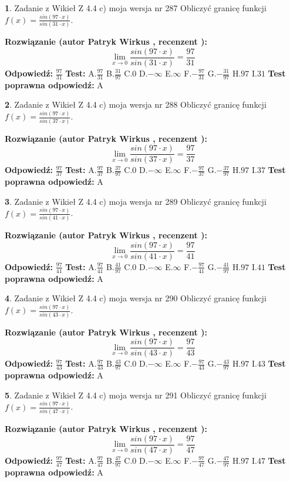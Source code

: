 \documentclass[12pt, a4paper]{article}
\theoremstyle{definition} %
\newtheorem{zad}{}
\newcommand{\zadStart}[1]{\begin{zad}#1\newline}
\newcommand{\zadStop}{\end{zad}}
\newcommand{\rozwStart}[2]{\noindent \textbf{Rozwiązanie (autor #1 , recenzent #2): }\newline}
\newcommand{\rozwStop}{\newline}
\newcommand{\odpStart}{\noindent \textbf{Odpowiedź:}\newline}
\newcommand{\odpStop}{\newline}
\newcommand{\testStart}{\noindent \textbf{Test:}\newline}
\newcommand{\testStop}{\newline}
\newcommand{\kluczStart}{\noindent \textbf{Test poprawna odpowiedź:}\newline}
\newcommand{\kluczStop}{\newline}
\begin{document}
\zadStart{Zadanie z Wikieł Z 4.4 c) moja wersja nr 287}
Obliczyć granicę funkcji $f(x)=\frac{sin(97\cdot x)}{sin(31\cdot x)}$.
\zadStop
\rozwStart{Patryk Wirkus}{}
$$\lim\limits_{x\to 0}\frac{sin(97\cdot x)}{sin(31\cdot x)}=
\frac{97}{31}$$
\rozwStop
\odpStart
$\frac{97}{31}$
\odpStop
\testStart
A.$\frac{97}{31}$
B.$\frac{31}{97}$
C.$0$
D.$-\infty$
E.$\infty$
F.$-\frac{97}{31}$
G.$-\frac{31}{97}$
H.$97$
I.$31$
\testStop
\kluczStart
A
\kluczStop



\zadStart{Zadanie z Wikieł Z 4.4 c) moja wersja nr 288}
Obliczyć granicę funkcji $f(x)=\frac{sin(97\cdot x)}{sin(37\cdot x)}$.
\zadStop
\rozwStart{Patryk Wirkus}{}
$$\lim\limits_{x\to 0}\frac{sin(97\cdot x)}{sin(37\cdot x)}=
\frac{97}{37}$$
\rozwStop
\odpStart
$\frac{97}{37}$
\odpStop
\testStart
A.$\frac{97}{37}$
B.$\frac{37}{97}$
C.$0$
D.$-\infty$
E.$\infty$
F.$-\frac{97}{37}$
G.$-\frac{37}{97}$
H.$97$
I.$37$
\testStop
\kluczStart
A
\kluczStop



\zadStart{Zadanie z Wikieł Z 4.4 c) moja wersja nr 289}
Obliczyć granicę funkcji $f(x)=\frac{sin(97\cdot x)}{sin(41\cdot x)}$.
\zadStop
\rozwStart{Patryk Wirkus}{}
$$\lim\limits_{x\to 0}\frac{sin(97\cdot x)}{sin(41\cdot x)}=
\frac{97}{41}$$
\rozwStop
\odpStart
$\frac{97}{41}$
\odpStop
\testStart
A.$\frac{97}{41}$
B.$\frac{41}{97}$
C.$0$
D.$-\infty$
E.$\infty$
F.$-\frac{97}{41}$
G.$-\frac{41}{97}$
H.$97$
I.$41$
\testStop
\kluczStart
A
\kluczStop



\zadStart{Zadanie z Wikieł Z 4.4 c) moja wersja nr 290}
Obliczyć granicę funkcji $f(x)=\frac{sin(97\cdot x)}{sin(43\cdot x)}$.
\zadStop
\rozwStart{Patryk Wirkus}{}
$$\lim\limits_{x\to 0}\frac{sin(97\cdot x)}{sin(43\cdot x)}=
\frac{97}{43}$$
\rozwStop
\odpStart
$\frac{97}{43}$
\odpStop
\testStart
A.$\frac{97}{43}$
B.$\frac{43}{97}$
C.$0$
D.$-\infty$
E.$\infty$
F.$-\frac{97}{43}$
G.$-\frac{43}{97}$
H.$97$
I.$43$
\testStop
\kluczStart
A
\kluczStop



\zadStart{Zadanie z Wikieł Z 4.4 c) moja wersja nr 291}
Obliczyć granicę funkcji $f(x)=\frac{sin(97\cdot x)}{sin(47\cdot x)}$.
\zadStop
\rozwStart{Patryk Wirkus}{}
$$\lim\limits_{x\to 0}\frac{sin(97\cdot x)}{sin(47\cdot x)}=
\frac{97}{47}$$
\rozwStop
\odpStart
$\frac{97}{47}$
\odpStop
\testStart
A.$\frac{97}{47}$
B.$\frac{47}{97}$
C.$0$
D.$-\infty$
E.$\infty$
F.$-\frac{97}{47}$
G.$-\frac{47}{97}$
H.$97$
I.$47$
\testStop
\kluczStart
A
\kluczStop
\end{document}

